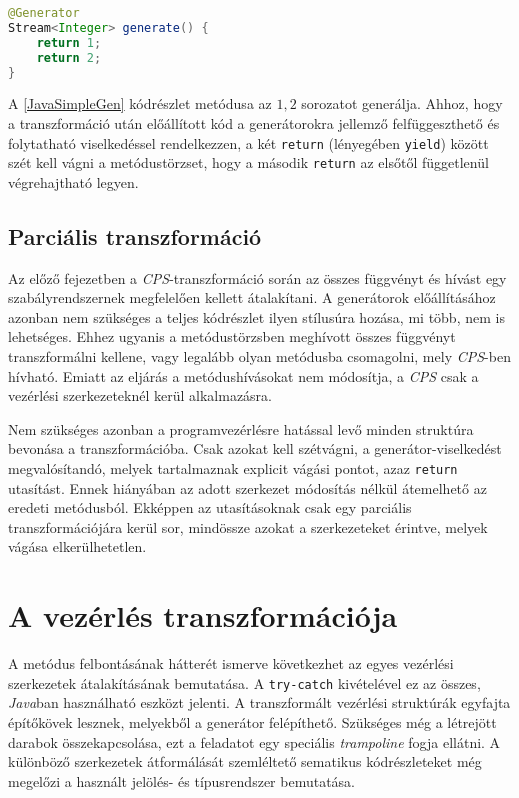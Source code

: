 \begin{lstlisting}[language=Java, caption={Az $1, 2$ sorozatot előállító generátor}, captionpos=b, label=JavaSimpleGen, escapechar=$]
@Generator
Stream<Integer> generate() {
    return 1;
    return 2;
}
\end{lstlisting}

A \ref{JavaSimpleGen} kódrészlet metódusa az $1, 2$ sorozatot generálja. Ahhoz, hogy a transzformáció után előállított kód a generátorokra jellemző felfüggeszthető és folytatható viselkedéssel rendelkezzen, a két \texttt{return} (lényegében \texttt{yield}) között szét kell vágni a metódustörzset, hogy a második \texttt{return} az elsőtől függetlenül végrehajtható legyen.

\subsection{Parciális transzformáció}

Az előző fejezetben a \textit{CPS}-transzformáció során az összes függvényt és hívást egy szabályrendszernek megfelelően kellett átalakítani. A generátorok előállításához azonban nem szükséges a teljes kódrészlet ilyen stílusúra hozása, mi több, nem is lehetséges. Ehhez ugyanis a metódustörzsben meghívott összes függvényt transzformálni kellene, vagy legalább olyan metódusba csomagolni, mely \textit{CPS}-ben hívható. Emiatt az eljárás a metódushívásokat nem módosítja, a \textit{CPS} csak a vezérlési szerkezeteknél kerül alkalmazásra.

Nem szükséges azonban a programvezérlésre hatással levő minden struktúra bevonása a transzformációba. Csak azokat kell szétvágni, a generátor-viselkedést megvalósítandó, melyek tartalmaznak explicit vágási pontot, azaz \texttt{return} utasítást. Ennek hiányában az adott szerkezet módosítás nélkül átemelhető az eredeti metódusból. Ekképpen az utasításoknak csak egy parciális transzformációjára kerül sor, mindössze azokat a szerkezeteket érintve, melyek vágása elkerülhetetlen.

\section{A vezérlés transzformációja}

A metódus felbontásának hátterét ismerve következhet az egyes vezérlési szerkezetek átalakításának bemutatása. A \texttt{try-catch} kivételével ez az összes, \textit{Java}ban használható eszközt jelenti. A transzformált vezérlési struktúrák egyfajta építőkövek lesznek, melyekből a generátor felépíthető. Szükséges még a létrejött darabok összekapcsolása, ezt a feladatot egy speciális \textit{trampoline} fogja ellátni. A különböző szerkezetek átformálását szemléltető sematikus kódrészleteket még megelőzi a használt jelölés- és típusrendszer bemutatása.

